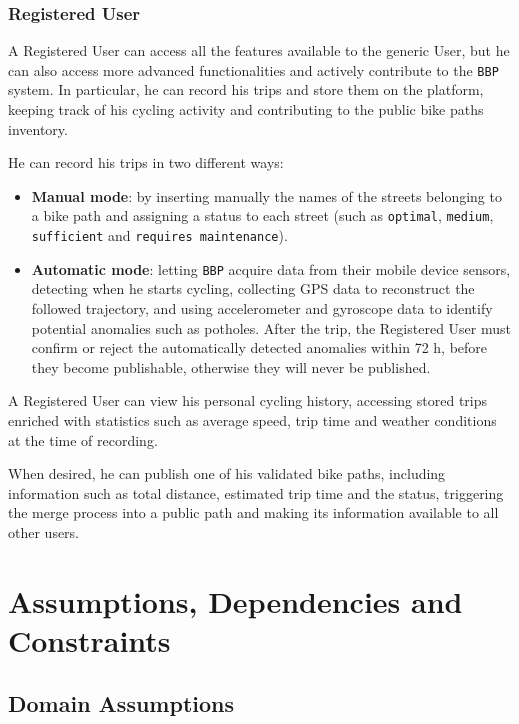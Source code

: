 \subsubsection{Registered User}

A Registered User can access all the features available to the generic User, but he can also access more advanced functionalities and actively contribute to the \texttt{BBP} system. In particular, he can record his trips and store them on the platform, keeping track of his cycling activity and contributing to the public bike paths inventory.

He can record his trips in two different ways:
\begin{itemize}
    \item \textbf{Manual mode}: by inserting manually the names of the streets belonging to a bike path and assigning a status to each street (such as \texttt{optimal}, \texttt{medium}, \texttt{sufficient} and \texttt{requires maintenance}).
    \item \textbf{Automatic mode}: letting \texttt{BBP} acquire data from their mobile device sensors, detecting when he starts cycling, collecting GPS data to reconstruct the followed trajectory, and using accelerometer and gyroscope data to identify potential anomalies such as potholes. After the trip, the Registered User must confirm or reject the automatically detected anomalies within 72 h, before they become publishable, otherwise they will never be published.
\end{itemize}

A Registered User can view his personal cycling history, accessing stored trips enriched with statistics such as average speed, trip time and weather conditions at the time of recording.

When desired, he can publish one of his validated bike paths, including information such as total distance, estimated trip time and the status, triggering the merge process into a public path and making its information available to all other users.

\section{Assumptions, Dependencies and Constraints}
\label{sec:assumptions}

\subsection{Domain Assumptions}

